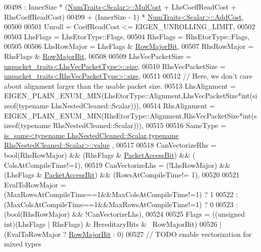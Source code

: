 \begin{DoxyCode}
00498                   : InnerSize * (\hyperlink{group___core___module_struct_eigen_1_1_num_traits}{NumTraits<Scalar>::MulCost} + LhsCoeffReadCost + 
      RhsCoeffReadCost)
00499                     + (InnerSize - 1) * \hyperlink{group___core___module_struct_eigen_1_1_num_traits}{NumTraits<Scalar>::AddCost},
00500 
00501     Unroll = CoeffReadCost <= EIGEN\_UNROLLING\_LIMIT,
00502     
00503     LhsFlags = LhsEtorType::Flags,
00504     RhsFlags = RhsEtorType::Flags,
00505     
00506     LhsRowMajor = LhsFlags & \hyperlink{group__flags_gae4f56c2a60bbe4bd2e44c5b19cbe8762}{RowMajorBit},
00507     RhsRowMajor = RhsFlags & \hyperlink{group__flags_gae4f56c2a60bbe4bd2e44c5b19cbe8762}{RowMajorBit},
00508 
00509     LhsVecPacketSize = \hyperlink{struct_eigen_1_1internal_1_1unpacket__traits}{unpacket\_traits<LhsVecPacketType>::size},
00510     RhsVecPacketSize = \hyperlink{struct_eigen_1_1internal_1_1unpacket__traits}{unpacket\_traits<RhsVecPacketType>::size},
00511 
00512     \textcolor{comment}{// Here, we don't care about alignment larger than the usable packet size.}
00513     LhsAlignment = EIGEN\_PLAIN\_ENUM\_MIN(LhsEtorType::Alignment,LhsVecPacketSize*\textcolor{keywordtype}{int}(\textcolor{keyword}{sizeof}(\textcolor{keyword}{typename} 
      LhsNestedCleaned::Scalar))),
00514     RhsAlignment = EIGEN\_PLAIN\_ENUM\_MIN(RhsEtorType::Alignment,RhsVecPacketSize*\textcolor{keywordtype}{int}(\textcolor{keyword}{sizeof}(\textcolor{keyword}{typename} 
      RhsNestedCleaned::Scalar))),
00515       
00516     SameType = 
      \hyperlink{struct_eigen_1_1internal_1_1is__same}{is\_same<typename LhsNestedCleaned::Scalar,typename RhsNestedCleaned::Scalar>::value}
      ,
00517 
00518     CanVectorizeRhs = bool(RhsRowMajor) && (RhsFlags & \hyperlink{group__flags_ga1a306a438e1ab074e8be59512e887b9f}{PacketAccessBit}) && (
      ColsAtCompileTime!=1),
00519     CanVectorizeLhs = (!LhsRowMajor) && (LhsFlags & \hyperlink{group__flags_ga1a306a438e1ab074e8be59512e887b9f}{PacketAccessBit}) && (RowsAtCompileTime!=
      1),
00520 
00521     EvalToRowMajor = (MaxRowsAtCompileTime==1&&MaxColsAtCompileTime!=1) ? 1
00522                     : (MaxColsAtCompileTime==1&&MaxRowsAtCompileTime!=1) ? 0
00523                     : (\textcolor{keywordtype}{bool}(RhsRowMajor) && !CanVectorizeLhs),
00524 
00525     Flags = ((\textcolor{keywordtype}{unsigned} \textcolor{keywordtype}{int})(LhsFlags | RhsFlags) & HereditaryBits & ~RowMajorBit)
00526           | (EvalToRowMajor ? \hyperlink{group__flags_gae4f56c2a60bbe4bd2e44c5b19cbe8762}{RowMajorBit} : 0)
00527           \textcolor{comment}{// TODO enable vectorization for mixed types}

\end{DoxyCode}
